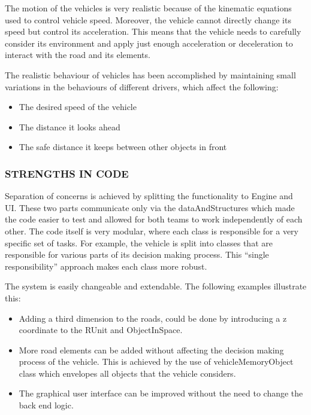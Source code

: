 \documentclass[11pt,a4paper]{article}
\begin{document}
		The motion of the vehicles is very realistic because of the kinematic equations used to control vehicle speed. Moreover, the vehicle cannot directly change its speed but control its acceleration. This means that the vehicle needs to carefully consider its environment and apply just enough acceleration or deceleration to interact with the road and its elements.
		
		The realistic behaviour of vehicles has been accomplished by maintaining small variations in the behaviours of different drivers, which affect the following:
		\begin{itemize}
			\item The desired speed of the vehicle
			\item The distance it looks ahead
			\item The safe distance it keeps between other objects in front
		\end{itemize}
		
		\subsubsection{STRENGTHS IN CODE}
		Separation of concerns is achieved by splitting the functionality to Engine and UI. These two parts communicate only via the dataAndStructures which made the code easier to test and allowed for both teams to work independently of each other.
		The code itself is very modular, where each class is responsible for a very specific set of tasks. For example, the vehicle is split into classes that are responsible for various parts of its decision making process. This “single responsibility” approach makes each class more robust.
		
		The system is easily changeable and extendable. The following examples illustrate this:
		
		\begin{itemize}
			\item Adding a third dimension to the roads, could be done by introducing a z coordinate to the RUnit and ObjectInSpace.
			\item More road elements can be added without affecting the decision making process of the vehicle. This is achieved by the use of vehicleMemoryObject class which envelopes all objects that the vehicle considers.
			\item The graphical user interface can be improved without the need to change the back end logic. 
		\end{itemize}
		
\end{document}
